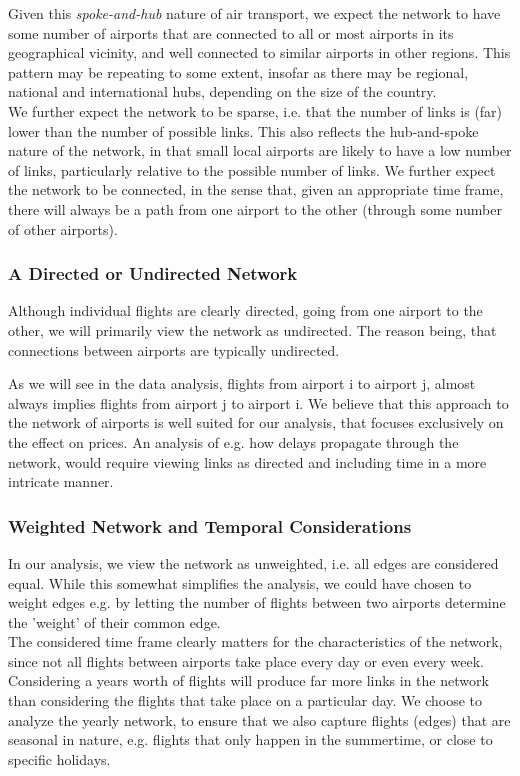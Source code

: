 Given this \textit{spoke-and-hub} nature of air transport, we expect the network to have some number of airports that are connected to all or most airports in its geographical vicinity, and well connected to similar airports in other regions. This pattern may be repeating to some extent, insofar as there may be regional, national and international hubs, depending on the size of the country. \\ 
\medskip
We further expect the network to be sparse, i.e. that the number of links is (far) lower than the number of possible links. This also reflects the hub-and-spoke nature of the network, in that small local airports are likely to have a low number of links, particularly relative to the possible number of links. We further expect the network to be connected, in the sense that, given an appropriate time frame, there will always be a path from one airport to the other (through some number of other airports).

\subsubsection{A Directed or Undirected Network}
Although individual flights are clearly directed, going from one airport to the other, we will primarily view the network as undirected. The reason being, that connections between airports are typically undirected.

As we will see in the data analysis, flights from airport i to airport j, almost always implies flights from airport j to airport i. We believe that this approach to the network of airports is well suited for our analysis, that focuses exclusively on the effect on prices. An analysis of e.g. how delays propagate through the network, would require viewing links as directed and including time in a more intricate manner.\\

\subsubsection{Weighted Network and Temporal Considerations}
In our analysis, we view the network as unweighted, i.e. all edges are considered equal. While this somewhat simplifies the analysis, we could have chosen to weight edges e.g. by letting the number of flights between two airports determine the 'weight' of their common edge. 
\medskip \\
The considered time frame clearly matters for the characteristics of the network, since not all flights between airports take place every day or even every week. Considering a years worth of flights will produce far more links in the network than considering the flights that take place on a particular day. We choose to analyze the yearly network, to ensure that we also capture flights (edges) that are seasonal in nature, e.g. flights that only happen in the summertime, or close to specific holidays. 

